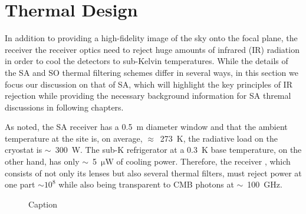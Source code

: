 
\section{Thermal Design}
\label{sec:optics_thermal_design}

In addition to providing a high-fidelity image of the sky onto the focal plane, the receiver the receiver optics need to reject huge amounts of infrared (IR) radiation in order to cool the detectors to sub-Kelvin temperatures. While the details of the SA and SO thermal filtering schemes differ in several ways, in this section we focus our discussion on that of SA, which will highlight the key principles of IR rejection while providing the necessary background information for SA thremal discussions in following chapters. 

As noted, the SA receiver has a 0.5~m diameter window and that the ambient temperature at the site is, on average, $\approx$~273~K, the radiative load on the cryostat is $\sim$~300~W. The sub-K refrigerator at a 0.3~K base temperature, on the other hand, has only $\sim$~5~$\mathrm{\mu W}$ of cooling power. Therefore, the receiver , which consists of not only its lenses but also several thermal filters, must reject power at one part $\sim 10^{8}$ while also being transparent to CMB photons at $\sim$~100~GHz.

\begin{figure}[!t]
    \centering
    \caption{Caption}
    \label{fig:pb2_filters}
\end{figure}

